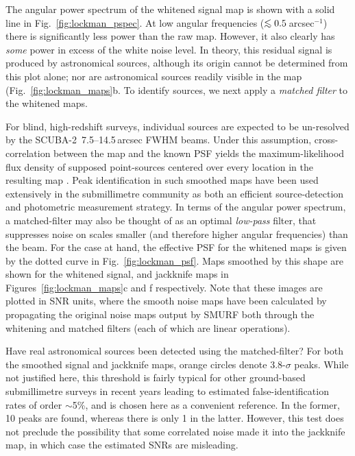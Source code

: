 \documentclass[useAMS,usenatbib,nofootinbib]{mn2e}
\newcommand{\scuba}{SCUBA-2}
\def\lsim{\mathrel{\lower2.5pt\vbox{\lineskip=0pt\baselineskip=0pt
          \hbox{$<$}\hbox{$\sim$}}}}
\begin{document}
The angular power spectrum of the whitened signal map is shown with a
solid line in Fig.~\ref{fig:lockman_pspec}. At low angular frequencies
($\lsim 0.5$\,arcsec$^{-1}$) there is significantly less power than
the raw map. However, it also clearly has \emph{some} power in excess
of the white noise level. In theory, this residual signal is produced
by astronomical sources, although its origin cannot be determined from
this plot alone; nor are astronomical sources readily visible in the
map (Fig.~\ref{fig:lockman_maps}b. To identify sources, we next apply
a \emph{matched filter} to the whitened maps.

For blind, high-redshift surveys, individual sources are expected to
be un-resolved by the \scuba\ 7.5--14.5\,arcsec FWHM beams. Under this
assumption, cross-correlation between the map and the known PSF yields
the maximum-likelihood flux density of supposed point-sources centered
over every location in the resulting map \citep[an extremely
well-known result throughout astronomy, see][]{stetson1987}. Peak
identification in such smoothed maps have been used extensively in the
submillimetre community as both an efficient source-detection and
photometric measurement strategy. In terms of the angular power
spectrum, a matched-filter may also be thought of as an optimal
\emph{low-pass} filter, that suppresses noise on scales smaller (and
therefore higher angular frequencies) than the beam. For the case at
hand, the effective PSF for the whitened maps is given by the dotted
curve in Fig.~\ref{fig:lockman_psf}. Maps smoothed by this shape are
shown for the whitened signal, and jackknife maps in
Figures~\ref{fig:lockman_maps}c and f respectively. Note that these
images are plotted in SNR units, where the smooth noise maps have been
calculated by propagating the original noise maps output by SMURF both
through the whitening and matched filters (each of which are linear
operations).

Have real astronomical sources been detected using the matched-filter?
For both the smoothed signal and jackknife maps, orange circles denote
3.8-$\sigma$ peaks. While not justified here, this threshold is fairly
typical for other ground-based submillimetre surveys in recent years
\citep[e.g.,][]{coppin2006,perera2008,weiss2009} leading to estimated
false-identification rates of order $\sim$5\%, and is chosen here as a
convenient reference. In the former, 10 peaks are found, whereas there
is only 1 in the latter. However, this test does not preclude the
possibility that some correlated noise made it into the jackknife
map, in which case the estimated SNRs are misleading.
\end{document}
